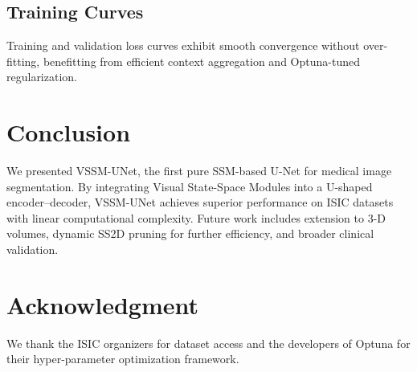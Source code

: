 \documentclass[conference]{IEEEtran}
\begin{document}
\subsection{Training Curves}
Training and validation loss curves exhibit smooth convergence without over-fitting, benefitting from efficient context aggregation and Optuna-tuned regularization.

\section{Conclusion}
We presented VSSM-UNet, the first pure SSM-based U-Net for medical image segmentation. By integrating Visual State-Space Modules into a U-shaped encoder–decoder, VSSM-UNet achieves superior performance on ISIC datasets with linear computational complexity.  Future work includes extension to 3-D volumes, dynamic SS2D pruning for further efficiency, and broader clinical validation.

\section*{Acknowledgment}
We thank the ISIC organizers for dataset access and the developers of Optuna for their hyper-parameter optimization framework.
\end{document}
